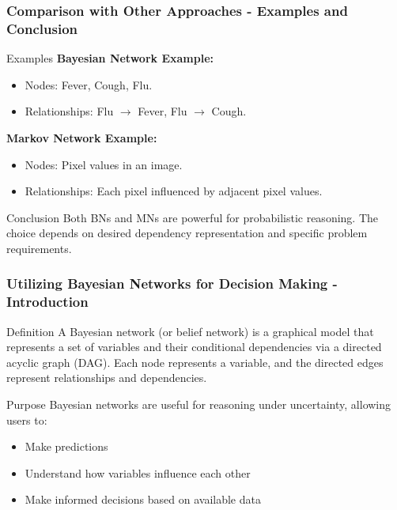 \documentclass[aspectratio=169]{beamer}
\begin{document}
\begin{frame}[fragile]
    \frametitle{Comparison with Other Approaches - Examples and Conclusion}
    
    \begin{block}{Examples}
        \textbf{Bayesian Network Example:}
        \begin{itemize}
            \item Nodes: Fever, Cough, Flu.
            \item Relationships: Flu $\to$ Fever, Flu $\to$ Cough.
        \end{itemize}
        
        \textbf{Markov Network Example:}
        \begin{itemize}
            \item Nodes: Pixel values in an image.
            \item Relationships: Each pixel influenced by adjacent pixel values.
        \end{itemize}
    \end{block}

    \begin{block}{Conclusion}
        Both BNs and MNs are powerful for probabilistic reasoning. The choice depends on desired dependency representation and specific problem requirements.
    \end{block}
\end{frame}

\begin{frame}[fragile]
    \frametitle{Utilizing Bayesian Networks for Decision Making - Introduction}
    \begin{block}{Definition}
        A Bayesian network (or belief network) is a graphical model that represents a set of variables and their conditional dependencies via a directed acyclic graph (DAG). Each node represents a variable, and the directed edges represent relationships and dependencies.
    \end{block}

    \begin{block}{Purpose}
        Bayesian networks are useful for reasoning under uncertainty, allowing users to:
        \begin{itemize}
            \item Make predictions
            \item Understand how variables influence each other
            \item Make informed decisions based on available data
        \end{itemize}
    \end{block}
\end{frame}
\end{document}
